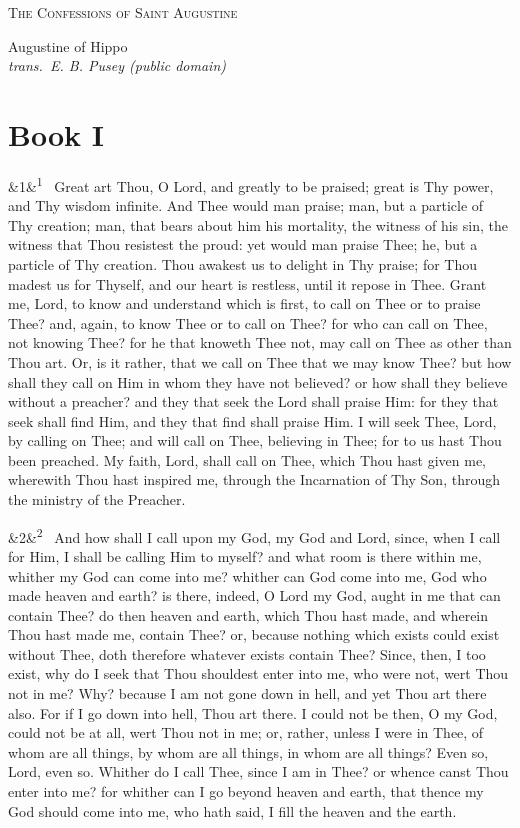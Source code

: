 \documentclass[12pt]{article}
\newcommand{\work}[1]{\begin{center}\LARGE\scshape #1\end{center}}
\newcommand{\attrib}[2]{\begin{center}\large #1\\[2pt]\small\itshape trans.\ #2\end{center}\vspace{1em}}
\newcommand{\para}[1][]{\par\noindent\ifx&#1&\else\textsuperscript{\footnotesize #1}~\fi}
\begin{document}
\work{The Confessions of Saint Augustine}

\attrib{Augustine of Hippo}{E. B. Pusey (public domain)}

\section*{Book I}

\para[1] Great art Thou, O Lord, and greatly to be praised; great is Thy power, and Thy wisdom infinite. And Thee would man praise; man, but a particle of Thy creation; man, that bears about him his mortality, the witness of his sin, the witness that Thou resistest the proud: yet would man praise Thee; he, but a particle of Thy creation. Thou awakest us to delight in Thy praise; for Thou madest us for Thyself, and our heart is restless, until it repose in Thee. Grant me, Lord, to know and understand which is first, to call on Thee or to praise Thee? and, again, to know Thee or to call on Thee? for who can call on Thee, not knowing Thee? for he that knoweth Thee not, may call on Thee as other than Thou art. Or, is it rather, that we call on Thee that we may know Thee? but how shall they call on Him in whom they have not believed? or how shall they believe without a preacher? and they that seek the Lord shall praise Him: for they that seek shall find Him, and they that find shall praise Him. I will seek Thee, Lord, by calling on Thee; and will call on Thee, believing in Thee; for to us hast Thou been preached. My faith, Lord, shall call on Thee, which Thou hast given me, wherewith Thou hast inspired me, through the Incarnation of Thy Son, through the ministry of the Preacher.

\para[2] And how shall I call upon my God, my God and Lord, since, when I call for Him, I shall be calling Him to myself? and what room is there within me, whither my God can come into me? whither can God come into me, God who made heaven and earth? is there, indeed, O Lord my God, aught in me that can contain Thee? do then heaven and earth, which Thou hast made, and wherein Thou hast made me, contain Thee? or, because nothing which exists could exist without Thee, doth therefore whatever exists contain Thee? Since, then, I too exist, why do I seek that Thou shouldest enter into me, who were not, wert Thou not in me? Why? because I am not gone down in hell, and yet Thou art there also. For if I go down into hell, Thou art there. I could not be then, O my God, could not be at all, wert Thou not in me; or, rather, unless I were in Thee, of whom are all things, by whom are all things, in whom are all things? Even so, Lord, even so. Whither do I call Thee, since I am in Thee? or whence canst Thou enter into me? for whither can I go beyond heaven and earth, that thence my God should come into me, who hath said, I fill the heaven and the earth.
\end{document}
